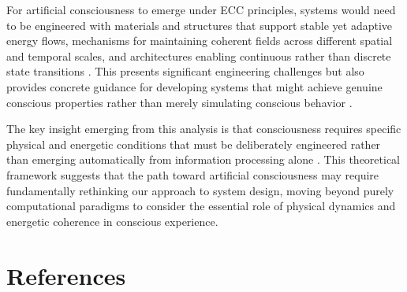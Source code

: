 \begin{refsection}
For artificial consciousness to emerge under ECC principles, systems would need to be engineered with materials and structures that support stable yet adaptive energy flows, mechanisms for maintaining coherent fields across different spatial and temporal scales, and architectures enabling continuous rather than discrete state transitions \cite{Pfeifer2006}. This presents significant engineering challenges but also provides concrete guidance for developing systems that might achieve genuine conscious properties rather than merely simulating conscious behavior \cite{Clark2013}.

The key insight emerging from this analysis is that consciousness requires specific physical and energetic conditions that must be deliberately engineered rather than emerging automatically from information processing alone \cite{DiPaolo2005}. This theoretical framework suggests that the path toward artificial consciousness may require fundamentally rethinking our approach to system design, moving beyond purely computational paradigms to consider the essential role of physical dynamics and energetic coherence in conscious experience.





















\newpage
\section{References}
\printbibliography[title={},heading=subbibliography]
\end{refsection}